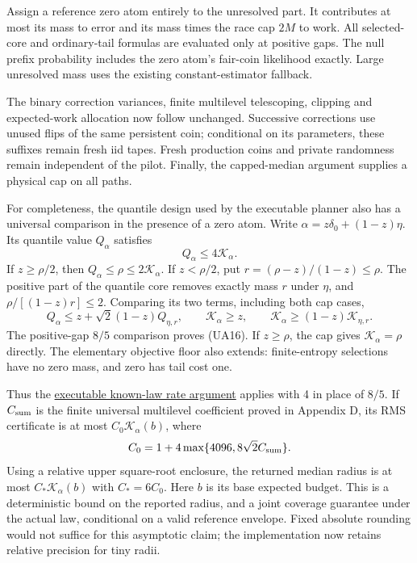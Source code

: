 Assign a reference zero atom entirely to the unresolved part. It contributes
at most its mass to error and its mass times the race cap $2M$ to work. All selected-core
and ordinary-tail formulas are evaluated only at positive gaps. The null
prefix probability includes the zero atom's fair-coin likelihood exactly.
Large unresolved mass uses the existing constant-estimator fallback.

The binary correction variances, finite multilevel telescoping, clipping and
expected-work allocation now follow unchanged. Successive corrections use
unused flips of the same persistent coin; conditional on its parameters,
these suffixes remain fresh iid tapes. Fresh production coins and private
randomness remain independent of the pilot. Finally, the capped-median
argument supplies a physical cap on all paths.

For completeness, the quantile design used by the executable planner also
has a universal comparison in the presence of a zero atom. Write
$\alpha=z\delta_0+(1-z)\eta$. Its quantile value $Q_\alpha$ satisfies
\[
 Q_\alpha\le4\mathcal K_\alpha.                                \tag{UA16}
\]
If $z\ge\rho/2$, then $Q_\alpha\le\rho\le2\mathcal K_\alpha$. If $z<\rho/2$, put
$r=(\rho-z)/(1-z)\le\rho$. The positive part of the quantile core removes
exactly mass $r$ under $\eta$, and
$\rho/[(1-z)r]\le2$. Comparing its two terms, including both cap cases,
\[
 Q_\alpha\le z+\sqrt2(1-z)Q_{\eta,r},\qquad
 \mathcal K_\alpha\ge z,\qquad \mathcal K_\alpha\ge(1-z)\mathcal K_{\eta,r}.
\]
The positive-gap $8/5$ comparison proves (UA16). If $z\ge\rho$, the cap gives
$\mathcal K_\alpha=\rho$ directly. The elementary objective floor also extends:
finite-entropy selections have no zero mass, and zero has tail cost one.

Thus the \href{https://github.com/davidiach/adaptive-threshold-estimation/blob/9dbddf6622c17f37fb98c79bcf4407f579318a45/docs/KNOWN_LAW_ESTIMATOR.md\#comparison-with-the-paper-rate}{executable known-law rate argument}
applies with 4 in place of $8/5$. If $C_{\rm sum}$ is the finite universal
multilevel coefficient proved in Appendix D, its RMS certificate is at most
$C_0\mathcal K_\alpha(b)$, where
\[
 C_0=1+4\max\{4096,8\sqrt2C_{\rm sum}\}.
\]
Using a relative upper square-root enclosure, the returned median radius is
at most $C_*\mathcal K_\alpha(b)$ with $C_*=6C_0$. Here $b$ is its base expected
budget. This is a deterministic bound on the reported radius, and a joint
coverage guarantee under the actual law, conditional on a valid reference
envelope. Fixed absolute rounding would not suffice for this asymptotic
claim; the implementation now retains relative precision for tiny radii.

